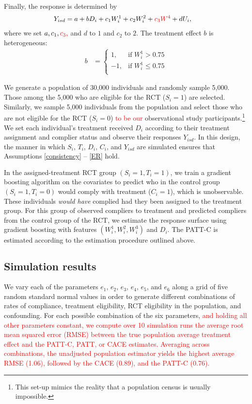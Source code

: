\documentclass[hidelinks,12pt]{article}
\begin{document}
Finally, the response is determined by 
%	
\begin{align*}
Y_{isd} &= a + bD_i + c_1W^{1}_i + c_2W^{2}_i + \textcolor{red}{c_3W^{4}} +dU_i,
\end{align*}
%
where we set $a, c_1, \textcolor{red}{c_3,}$ and $d$ to $1$ and $c_2$ to $2$. The treatment effect $b$ is heterogeneous:
\begin{align*}
b &= \left\{
			\begin{array}{rr}
        1, & \text{if } W^{1}_i > 0.75\\
		-1, & \text{if } W^{1}_i \leq 0.75\\
			\end{array}\right.
\end{align*}	 
 
We generate a population of 30,000 individuals and randomly sample 5,000. Those among the 5,000 who are eligible for the RCT ($S_i=1$) are selected. Similarly, we sample 5,000 individuals from the population and select those who are not eligible for the RCT ($S_i=0$) \textcolor{red}{to be our} observational study participants.\footnote{This set-up mimics the reality that a population census is usually impossible.} We set each individual's treatment received $D_i$ according to their treatment assignment and complier status and observe their responses $Y_{isd}$. In this design, the manner in which $S_i$, $T_i$, $D_i$, $C_i$, and $Y_{isd}$ are simulated ensures that Assumptions \eqref{consistency} -- \eqref{ER} hold.

In the assigned-treatment RCT group $(S_i = 1, T_i = 1)$, we train a gradient boosting algorithm \citep{friedman2001greedy} on the covariates to predict who in the control group $(S_i = 1, T_i = 0)$ would comply with treatment ($C_i=1$), which is unobservable. These individuals \textit{would have} complied had they been assigned to the treatment group. For this group of observed compliers to treatment and predicted compliers from the control group of the RCT, we estimate the response surface using gradient boosting with features $(W^{1}_i, W^{2}_i, W^{3}_i)$ and $D_i$. The PATT-C is estimated according to the estimation procedure outlined above.

\subsection{Simulation results}\label{sim-results}

We vary each of the parameters $e_1$, $e_2$, $e_3$, $e_4$, $e_5$, and $e_6$ along a grid of five random standard normal values in order to generate different combinations of rates of compliance, treatment eligibility, RCT eligibility in the population, and confounding. For each possible combination of the six parameters, \textcolor{red}{and holding all other parameters constant, we compute over 10 simulation runs the average root mean squared error (RMSE) between the true population average treatment effect and the PATT-C, PATT, or CACE estimates. Averaging across combinations, the unadjusted population estimator yields the highest average RMSE (1.06), followed by the CACE (0.89), and the PATT-C (0.76).} 
\end{document}
